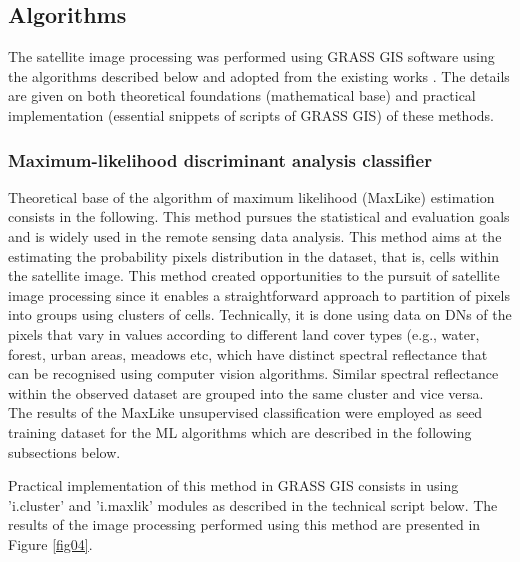 \documentclass[eprint,
approc,		%
]{actapoly}
\begin{document}
\subsection{Algorithms}

The satellite image processing was performed using GRASS GIS software using the algorithms described below and adopted from the existing works \citep{Lemenkova202217,Lemenkova202313}. The details are given on both theoretical foundations (mathematical base) and practical implementation (essential snippets of scripts of GRASS GIS) of these methods.

\subsubsection{Maximum-likelihood discriminant analysis classifier}

Theoretical base of the algorithm of maximum likelihood (MaxLike) estimation consists in the following. This method pursues the statistical and evaluation goals and is widely used in the remote sensing data analysis. This method aims at the estimating the probability pixels distribution in the dataset, that is, cells within the satellite image. This method  created opportunities to the pursuit of satellite image processing since it enables a straightforward approach to partition of pixels into groups using clusters of cells. Technically, it is done using data on DNs of the pixels that vary in values according to different land cover types (e.g., water, forest, urban areas, meadows etc, which have distinct spectral reflectance that can be recognised using computer vision algorithms. Similar spectral reflectance within the observed dataset are grouped into the same cluster and vice versa. The results of the MaxLike unsupervised classification were employed as seed training dataset for the ML algorithms which are described in the following subsections below.

Practical implementation of this method in GRASS GIS consists in using 'i.cluster' and 'i.maxlik' modules as described in the technical script below. The results of the image processing performed using this method are presented in Figure \ref{fig04}. 
\end{document}
